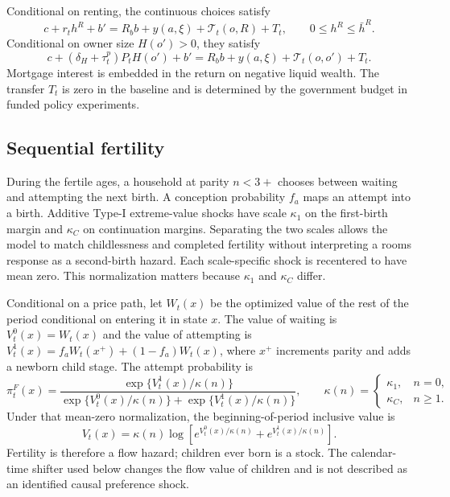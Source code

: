 \documentclass[11pt]{article}
\theoremstyle{definition}
\newcommand{\1}{\mathbf 1}
\begin{document}
Conditional on renting, the continuous choices satisfy
\begin{equation}
 c+r_t h^R+b'=R_b b+y(a,\xi)+\mathcal T_t(o,R)+T_t,
 \qquad 0\leq h^R\leq\bar h^R.
 \label{eq:renter_budget}
\end{equation}
Conditional on owner size $H(o')>0$, they satisfy
\begin{equation}
 c+(\delta_H+\tau_t^p)P_tH(o')+b'
 =R_b b+y(a,\xi)+\mathcal T_t(o,o')+T_t.
 \label{eq:owner_budget}
\end{equation}
Mortgage interest is embedded in the return on negative liquid wealth. The
transfer $T_t$ is zero in the baseline and is determined by the government
budget in funded policy experiments.

\subsection{Sequential fertility}

During the fertile ages, a household at parity $n<3+$ chooses between waiting
and attempting the next birth. A conception probability $f_a$ maps an attempt
into a birth. Additive Type-I extreme-value shocks have scale $\kappa_1$ on the
first-birth margin and $\kappa_C$ on continuation margins. Separating the two
scales allows the model to match childlessness and completed fertility without
interpreting a rooms response as a second-birth hazard.
Each scale-specific shock is recentered to have mean zero. This normalization
matters because $\kappa_1$ and $\kappa_C$ differ.

Conditional on a price path, let $W_t(x)$ be the optimized value of the rest of
the period conditional on entering it in state $x$. The value of waiting is
$V_t^0(x)=W_t(x)$ and the value of attempting is
$V_t^1(x)=f_aW_t(x^+)+(1-f_a)W_t(x)$, where $x^+$ increments parity and adds a
newborn child stage. The attempt probability is
\begin{equation}
 \pi_t^F(x)=
 \frac{\exp\{V_t^1(x)/\kappa(n)\}}
 {\exp\{V_t^0(x)/\kappa(n)\}+\exp\{V_t^1(x)/\kappa(n)\}},
 \qquad
 \kappa(n)=
 \begin{cases}\kappa_1,&n=0,\\ \kappa_C,&n\geq1.\end{cases}
 \label{eq:fertility_logit}
\end{equation}
Under that mean-zero normalization, the beginning-of-period inclusive value is
\begin{equation}
 V_t(x)=\kappa(n)\log\!\left[
 e^{V_t^0(x)/\kappa(n)}+e^{V_t^1(x)/\kappa(n)}\right].
 \label{eq:fertility_inclusive_value}
\end{equation}
Fertility is therefore a flow hazard; children ever born is a stock. The
calendar-time shifter used below changes the flow value of children and is not
described as an identified causal preference shock.
\end{document}
